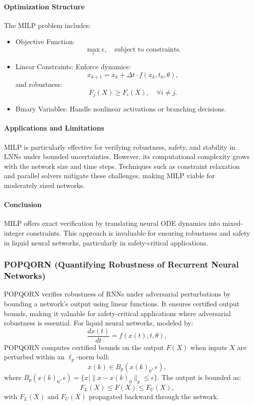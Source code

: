 \paragraph{Optimization Structure}
The MILP problem includes:
\begin{itemize}
    \item Objective Function:
    \[
    \max_\epsilon \epsilon, \quad \text{subject to constraints}.
    \]
    \item Linear Constraints: Enforce dynamics:
    \[
    x_{k+1} = x_k + \Delta t \cdot f(x_k, t_k, \theta),
    \]
    and robustness:
    \[
    F_j(X) \geq F_i(X), \quad \forall i \neq j.
    \]
    \item Binary Variables: Handle nonlinear activations or branching decisions.
\end{itemize}

\paragraph{Applications and Limitations}
MILP is particularly effective for verifying robustness, safety, and stability in LNNs under bounded uncertainties. However, its computational complexity grows with the network size and time steps. Techniques such as constraint relaxation and parallel solvers mitigate these challenges, making MILP viable for moderately sized networks.

\paragraph{Conclusion}
MILP offers exact verification by translating neural ODE dynamics into mixed-integer constraints. This approach is invaluable for ensuring robustness and safety in liquid neural networks, particularly in safety-critical applications. \cite{xueRNNBasedFrameworkMILP2023}

\subsubsection{POPQORN (Quantifying Robustness of Recurrent Neural Networks)}

POPQORN verifies robustness of RNNs under adversarial perturbations by bounding a network's output using linear functions. It ensures certified output bounds, making it valuable for safety-critical applications where adversarial robustness is essential. For liquid neural networks, modeled by:
\[
\frac{dx(t)}{dt} = f(x(t), t, \theta),
\]
POPQORN computes certified bounds on the output \(F(X)\) when inputs \(X\) are perturbed within an \(\ell_p\)-norm ball:
\[
x(k) \in B_p(x(k)_0, \epsilon),
\]
where \(B_p(x(k)_0, \epsilon) = \{x \mid \|x - x(k)_0\|_p \leq \epsilon\}\). The output is bounded as:
\[
F_L(X) \leq F(X) \leq F_U(X),
\]
with \(F_L(X)\) and \(F_U(X)\) propagated backward through the network.

